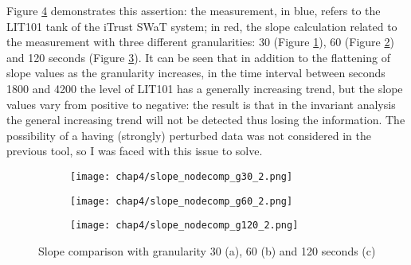 \bigskip
Figure \ref{fig:4_slope_comparison} demonstrates this assertion: the measurement, in blue, refers to the LIT101 tank of the iTrust SWaT system; in red, the slope calculation related to the measurement with three different granularities: 30 (Figure \ref{subfig:4_slope_g30_nodecomp}), 60 (Figure \ref{subfig:4_slope_g60_nodecomp}) and 120 seconds (Figure \ref{subfig:4_slope_g120_nodecomp}). It can be seen that in addition to the flattening of slope values as the granularity increases, in the time interval between seconds 1800 and 4200 the level of LIT101 has a generally increasing trend, but the slope values vary from positive to negative: the result is that in the invariant analysis the general increasing trend will not be detected thus losing the information.\newline
The possibility of a having (strongly) perturbed data was not considered in the previous tool, so I was faced with this issue to solve.
\vfill
\pagebreak

\begin{figure}[H]
	\centering
	\begin{subfigure}{0.9\textwidth}
		\texttt{[image: chap4/slope\_nodecomp\_g30\_2.png]}
		\caption{}
		\label{subfig:4_slope_g30_nodecomp}
	\end{subfigure}
	\hfill
	\begin{subfigure}{0.9\textwidth}
		\texttt{[image: chap4/slope\_nodecomp\_g60\_2.png]}
		\caption{}
		\label{subfig:4_slope_g60_nodecomp}
	\end{subfigure}
	\begin{subfigure}{0.9\textwidth}
		\texttt{[image: chap4/slope\_nodecomp\_g120\_2.png]}
		\caption{}
		\label{subfig:4_slope_g120_nodecomp}
	\end{subfigure}
	\caption{Slope comparison with granularity 30 (a), 60 (b) and 120 seconds (c)}
	\label{fig:4_slope_comparison}
\end{figure}


